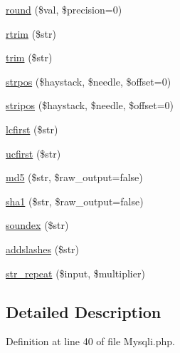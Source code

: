 \begin{DoxyCompactItemize}
\item 
\hyperlink{class_p_h_p_linq___adapter___mysqli_aa9d8fa8127391960c54ee0c5a31e18a3}{round} (\$val, \$precision=0)
\item 
\hyperlink{class_p_h_p_linq___adapter___mysqli_afa81b944f8aed770a266a9884e3e5049}{rtrim} (\$str)
\item 
\hyperlink{class_p_h_p_linq___adapter___mysqli_a432e7b973a6e6bfa55cced21e75ee29e}{trim} (\$str)
\item 
\hyperlink{class_p_h_p_linq___adapter___mysqli_a75b50139ee3829fbfd47af6805284786}{strpos} (\$haystack, \$needle, \$offset=0)
\item 
\hyperlink{class_p_h_p_linq___adapter___mysqli_aa0297b92e96759a576d3aa8caa22b10d}{stripos} (\$haystack, \$needle, \$offset=0)
\item 
\hyperlink{class_p_h_p_linq___adapter___mysqli_a30bdc1fd395302cfaeabd165adde41c9}{lcfirst} (\$str)
\item 
\hyperlink{class_p_h_p_linq___adapter___mysqli_a7d8809b3fca65a75b2bd2ebbea5b3695}{ucfirst} (\$str)
\item 
\hyperlink{class_p_h_p_linq___adapter___mysqli_ad89ffd1039629dc781704c405abc87a7}{md5} (\$str, \$raw\-\_\-output=false)
\item 
\hyperlink{class_p_h_p_linq___adapter___mysqli_aeb44f0e1038759e5c086db848661f845}{sha1} (\$str, \$raw\-\_\-output=false)
\item 
\hyperlink{class_p_h_p_linq___adapter___mysqli_a5d9e5163f9c4dfcf3b36a635c8ba5638}{soundex} (\$str)
\item 
\hyperlink{class_p_h_p_linq___adapter___mysqli_aec7fed6f81c650fb3106e2f0eed11e03}{addslashes} (\$str)
\item 
\hyperlink{class_p_h_p_linq___adapter___mysqli_a046ec25a1370781be01e1590d84aecf7}{str\-\_\-repeat} (\$input, \$multiplier)
\end{DoxyCompactItemize}


\subsection{\-Detailed \-Description}


\-Definition at line 40 of file \-Mysqli.\-php.




